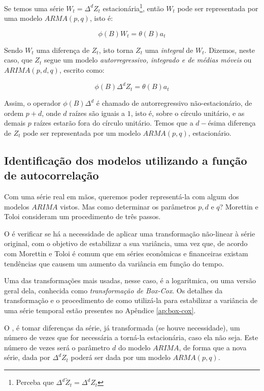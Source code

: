 Se temos uma série $W_t = \Delta^d Z_t$ estacionária\footnote{Perceba que $\Delta^d \tilde{Z}_t = \Delta^d Z_t$}, então $W_t$ pode ser representada por uma modelo $ARMA(p, q)$, isto é:

\[
\phi(B) W_t = \theta(B) a_t
\]

Sendo $W_t$ uma diferença de $Z_t$, isto torna $Z_t$ uma \emph{integral} de $W_t$. Dizemos, neste caso, 
que $Z_t$ segue um modelo \emph{autorregressivo, integrado e de médias móveis} ou $ARIMA(p, d, q)$, escrito como:

\begin{equation}\label{series:5.75}
\phi(B) \Delta^d Z_t = \theta(B) a_t
\end{equation}

Assim, o operador $\phi(B) \Delta^d$ é chamado de autorregressivo não-estacionário, de ordem $p{+}d$, onde $d$ raízes são iguais a $1$, isto é, sobre o círculo unitário, e as demais $p$ raízes estarão fora do círculo unitário. Temos que a $d-$ésima diferença de $Z_t$ pode ser representada por um modelo $ARMA(p, q)$, estacionário. 

\subsection{Identificação dos modelos utilizando a função de autocorrelação}

Com uma série real em mãos, queremos poder representá-la com algum dos modelos $ARIMA$ vistos. Mas como determinar os parâmetros $p, d \text{ e } q$? Morettin e Toloi \citep{morettin} consideram um procedimento de três passos.

O  é verificar se há a necessidade de aplicar uma transformação não-linear à série original, com o objetivo de estabilizar a sua variância, uma vez que, de acordo com Morettin e Toloi \citep{morettin} é comum que em séries econômicas e financeiras existam tendências que causem um aumento da variância em função do tempo.

Uma das transformações mais usadas, nesse caso, é a logarítmica, ou uma versão geral dela, conhecida como \emph{transformação de Box-Cox}. Os detalhes da transformação e o procedimento de como utilizá-la para estabilizar a variância de uma série temporal estão presentes no Apêndice \ref{ap:box-cox}.

O , é tomar diferenças da série, já transformada (se houve necessidade), um número de vezes que for necessária a torná-la estacionária, caso ela não seja. Este número de vezes será o parâmetro $d$ do modelo $ARIMA$, de forma que a nova série, dada por $\Delta^d Z_t$ poderá ser dada por um modelo $ARMA(p, q)$.

